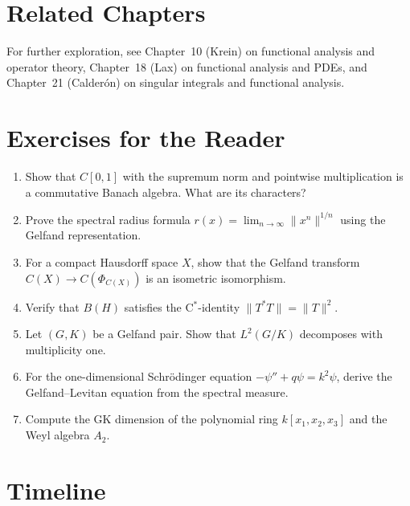 \section{Related Chapters}
For further exploration, see Chapter~10 (Krein) on functional analysis and operator theory, Chapter~18 (Lax) on functional analysis and PDEs, and Chapter~21 (Calder\'on) on singular integrals and functional analysis.

\section*{Exercises for the Reader}

\begin{enumerate}
    \item [B] Show that $C[0,1]$ with the supremum norm and pointwise multiplication is a commutative Banach algebra. What are its characters?
    \item [I] Prove the spectral radius formula $r(x) = \lim_{n\to\infty} \|x^n\|^{1/n}$ using the Gelfand representation.
    \item [I] For a compact Hausdorff space $X$, show that the Gelfand transform $C(X) \to C(\Phi_{C(X)})$ is an isometric isomorphism.
    \item [B] Verify that $B(H)$ satisfies the C$^*$-identity $\|T^* T\| = \|T\|^2$.
    \item [I] Let $(G,K)$ be a Gelfand pair. Show that $L^2(G/K)$ decomposes with multiplicity one.
    \item [A] For the one-dimensional Schr\"odinger equation $-\psi'' + q\psi = k^2\psi$, derive the Gelfand--Levitan equation from the spectral measure.
    \item [I] Compute the GK dimension of the polynomial ring $k[x_1,x_2,x_3]$ and the Weyl algebra $A_2$.
\end{enumerate}

\section*{Timeline}

